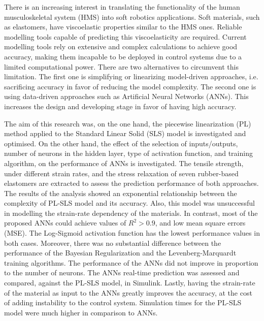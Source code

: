 


\begin{abstracts}        %

\setlength{\parindent}{17.62482pt}
\setlength{\parskip}{0.0pt plus 1.0pt}

There is an increasing interest in translating the functionality of the human musculoskeletal system (HMS) into soft robotics applications. Soft materials, such as elastomers, have viscoelastic properties similar to the HMS ones. Reliable modelling tools capable of predicting this viscoelasticity are required. Current modelling tools rely on extensive and complex calculations to achieve good accuracy, making them incapable to be deployed in control systems due to a limited computational power. There are two alternatives to circumvent this limitation. The first one is simplifying or linearizing model-driven approaches, i.e. sacrificing accuracy in favor of reducing the model complexity. The second one is using data-driven approaches such as  Artificial Neural Networks (ANNs). This increases the design and developing stage in favor of having high accuracy. 

The aim of this research was, on the one hand, the piecewise linearization (PL) method applied to the Standard Linear Solid (SLS) model is investigated and optimised. On the other hand, the effect of the selection of inputs/outputs, number of neurons in the hidden layer, type of activation function, and training algorithm, on the performance of ANNs is investigated. The tensile strength, under different strain rates, and the stress relaxation of seven rubber-based elastomers are extracted to assess the prediction performance of both approaches. The results of the analysis showed an exponential relationship between the complexity of PL-SLS model and its accuracy. Also, this model was unsuccessful in modelling the strain-rate dependency of the materials. In contrast, most of the proposed ANNs could achieve values of $R^2>0.9$, and low mean square errors (MSE). The Log-Sigmoid activation function has the lowest performance values in both cases. Moreover, there was no substantial difference between the performance of the Bayesian Regularization and the Levenberg-Marquardt training algorithms. The performance of the ANNs did not improve in proportion to the number of neurons. The ANNs real-time prediction was assessed and compared, against the PL-SLS model, in Simulink. Lastly, having the strain-rate of the material as input to the ANNs greatly improves the accuracy, at the cost of adding instability to the control system. Simulation times for the PL-SLS model were much higher in comparison to ANNs.


\end{abstracts}

